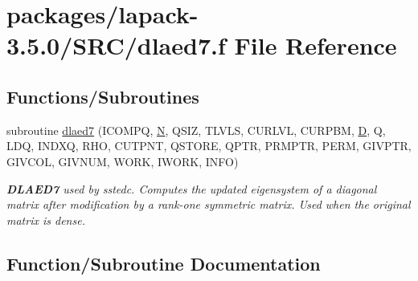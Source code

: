 \hypertarget{dlaed7_8f}{}\section{packages/lapack-\/3.5.0/\+S\+R\+C/dlaed7.f File Reference}
\label{dlaed7_8f}
\subsection*{Functions/\+Subroutines}
\begin{DoxyCompactItemize}
\item 
subroutine \hyperlink{dlaed7_8f_aedf7938fc27fcf7276594eaa168b9dcd}{dlaed7} (I\+C\+O\+M\+P\+Q, \hyperlink{polmisc_8c_a0240ac851181b84ac374872dc5434ee4}{N}, Q\+S\+I\+Z, T\+L\+V\+L\+S, C\+U\+R\+L\+V\+L, C\+U\+R\+P\+B\+M, \hyperlink{odrpack_8h_a7dae6ea403d00f3687f24a874e67d139}{D}, Q, L\+D\+Q, I\+N\+D\+X\+Q, R\+H\+O, C\+U\+T\+P\+N\+T, Q\+S\+T\+O\+R\+E, Q\+P\+T\+R, P\+R\+M\+P\+T\+R, P\+E\+R\+M, G\+I\+V\+P\+T\+R, G\+I\+V\+C\+O\+L, G\+I\+V\+N\+U\+M, W\+O\+R\+K, I\+W\+O\+R\+K, I\+N\+F\+O)
\begin{DoxyCompactList}\small\item\em {\bfseries D\+L\+A\+E\+D7} used by sstedc. Computes the updated eigensystem of a diagonal matrix after modification by a rank-\/one symmetric matrix. Used when the original matrix is dense. \end{DoxyCompactList}\end{DoxyCompactItemize}


\subsection{Function/\+Subroutine Documentation}
\hypertarget{dlaed7_8f_aedf7938fc27fcf7276594eaa168b9dcd}{}
